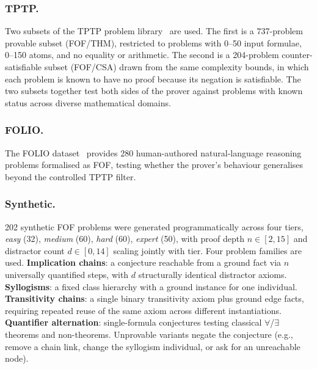 \subsubsection{TPTP.}
Two subsets of the TPTP problem library~\cite{Sut17} are used. The first is a
737-problem provable subset (FOF/THM), restricted to problems with 0--50 input
formulae, 0--150 atoms, and no equality or arithmetic. The second is a
204-problem counter-satisfiable subset (FOF/CSA) drawn from the same
complexity bounds, in which each problem is known to have no proof because
its negation is satisfiable. The two subsets together test both sides
of the prover against problems with
known status across diverse mathematical domains.

\subsubsection{FOLIO.}
The FOLIO dataset~\cite{han2024folio} provides 280 human-authored
natural-language reasoning problems formalised as FOF, testing whether the
prover's behaviour generalises beyond the controlled TPTP filter.

\subsubsection{Synthetic.}
202 synthetic FOF problems were generated programmatically across four tiers,
\emph{easy} (32), \emph{medium} (60), \emph{hard} (60), \emph{expert}
(50), with proof depth $n\in[2,15]$ and distractor count $d\in[0,14]$
scaling jointly with tier. Four problem families are used.
\textbf{Implication chains}: a conjecture reachable from a ground fact via
$n$ universally quantified steps, with $d$ structurally identical
distractor axioms. \textbf{Syllogisms}: a fixed class hierarchy with a
ground instance for one individual. \textbf{Transitivity chains}: a single
binary transitivity axiom plus ground edge facts, requiring repeated reuse
of the same axiom across different instantiations.
\textbf{Quantifier alternation}: single-formula conjectures testing
classical $\forall$/$\exists$ theorems and non-theorems. Unprovable
variants negate the conjecture (e.g., remove a chain link, change the
syllogism individual, or ask for an unreachable node).
